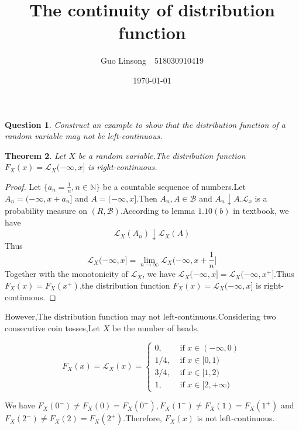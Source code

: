 \documentclass{article}
\title{The continuity of distribution function}
\author{Guo Linsong~~518030910419}
\date{\today}
\newtheorem{theorem}{Theorem}
\newtheorem{question}[theorem]{Question}
\begin{document}
    \maketitle

\begin{tcolorbox}
    \begin{question}\label{question}
    Construct an example to show that the distribution function of a random variable may not be left-continuous.
   \end{question}
\end{tcolorbox}



\begin{theorem}
Let $X$ be a random variable.The distribution function $F_X(x)=\mathcal{L}_X(-\infty,x]$ is right-continuous.
\end{theorem}

\begin{proof}
    Let $\{a_n=\frac{1}{n},n\in\mathbb{N}\}$ be a countable sequence of numbers.Let $A_n=(-\infty,x+a_n]$ and $A=(-\infty,x]$.Then $A_n,A\in \mathcal{B}$ and $A_n\downarrow A$.$\mathcal{L}_x$ is a probability measure on $(R,\mathcal{B})$.According to lemma $1.10(b)$ in textbook, we have $$\mathcal{L}_X(A_n)\downarrow\mathcal{L}_X(A)$$
    Thus $$\mathcal{L}_X(-\infty, x]=\lim\limits_{n\rightarrow\infty}\mathcal{L}_X(-\infty, x+\frac{1}{n}]$$
    Together with the monotonicity of $\mathcal{L}_X$, we have $\mathcal{L}_X(-\infty, x]=\mathcal{L}_X(-\infty, x^{+}]$.Thus $F_X(x)=F_X(x^{+})$,the distribution function $F_X(x)=\mathcal{L}_X(-\infty,x]$ is right-continuous.
\end{proof}
 
However,The distribution function may not left-continuous.Considering two consecutive coin tosses,Let $X$ be the number of heads.

$$F_{X}(x)=  \mathcal{L}_X(x)=\left\{\begin{array}{ll}
0, & \text { if } x\in(-\infty,0) \\
1 / 4, & \text { if } x \in [0,1) \\
3 / 4, & \text { if } x \in [1,2) \\
1, & \text { if } x \in [2,+\infty)
\end{array}\right.$$

We have $F_X(0^-)\neq F_X(0)=F_X(0^+),F_X(1^-)\neq F_X(1)=F_X(1^+)$ and $F_X(2^-)\neq F_X(2)=F_X(2^+)$.Therefore, $F_X(x)$ is not left-continuous.
\end{document}
